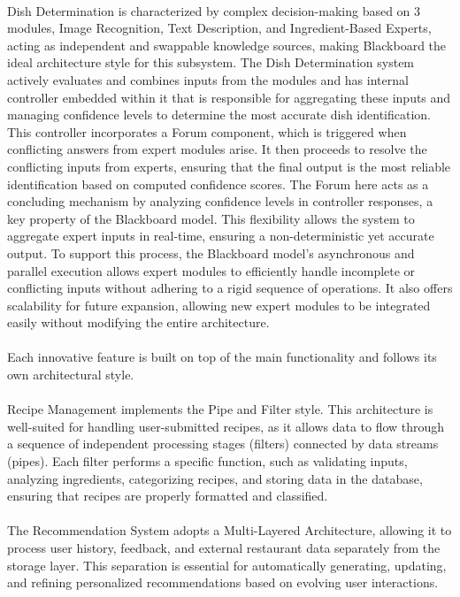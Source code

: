 \documentclass[]{article}
\begin{document}
\\
Dish Determination is characterized by complex decision-making based on 3 modules, Image Recognition, Text Description, and Ingredient-Based Experts, acting as independent and swappable knowledge sources, making Blackboard the ideal architecture style for this subsystem. 
The Dish Determination system actively evaluates and combines inputs from the modules and has internal controller embedded within it that is responsible for aggregating these inputs and managing confidence levels to determine the most accurate dish identification. 
This controller incorporates a Forum component, which is triggered when conflicting answers from expert modules arise.
It then proceeds to resolve the conflicting inputs from experts, ensuring that the final output is the most reliable identification based on computed confidence scores. 
The Forum here acts as a concluding mechanism by analyzing confidence levels in controller responses, a key property of the Blackboard model. 
This flexibility allows the system to aggregate expert inputs in real-time, ensuring a non-deterministic yet accurate output.  
To support this process, the Blackboard model’s asynchronous and parallel execution allows expert modules to efficiently handle incomplete or conflicting inputs without adhering to a rigid sequence of operations. 
It also offers scalability for future expansion, allowing new expert modules to be integrated easily without modifying the entire architecture.
\\
\\
Each innovative feature is built on top of the main functionality and follows its own architectural style.
\\
\\
Recipe Management implements the Pipe and Filter style. 
This architecture is well-suited for handling user-submitted recipes, as it allows data to flow through a sequence of independent processing stages (filters) connected by data streams (pipes). 
Each filter performs a specific function, such as validating inputs, analyzing ingredients, categorizing recipes, and storing data in the database, ensuring that recipes are properly formatted and classified. 
\\
\\
The Recommendation System adopts a Multi-Layered Architecture, allowing it to process user history, feedback, and external restaurant data separately from the storage layer. 
This separation is essential for automatically generating, updating, and refining personalized recommendations based on evolving user interactions.
\end{document}
